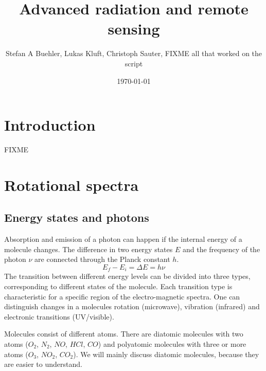 \documentclass[a4paper,fleqn]{article}
\title{Advanced radiation and remote sensing}
\author{Stefan A Buehler, Lukas Kluft, Christoph Sauter, FIXME all that worked on
the script}
\date{\today}
\begin{document}
\maketitle
\thispagestyle{empty}\pagestyle{empty}
\tableofcontents
\newpage\pagestyle{fancy}

\section{Introduction}

FIXME

\section{Rotational spectra}

\subsection{Energy states and photons}
Absorption and emission of a photon can happen if the internal energy of a
molecule changes. The difference in two energy states $E$ and the frequency of
the photon $\nu$ are connected through the Planck constant $h$.
\begin{equation}
  E_f - E_i = \Delta E = h \nu
\end{equation}
The transition between different energy levels can be divided into three types,
corresponding to different states of the molecule.  Each transition type is
characteristic for a specific region of the electro-magnetic spectra.  One can
distinguish changes in a molecules rotation (microwave), vibration (infrared)
and electronic transitions (UV/visible).

Molecules consist of different atoms. There are diatomic molecules with two
atoms ($O_2$, $N_2$, $NO$, $HCl$, $CO$) and polyatomic molecules with
three or more atoms ($O_3$, $NO_2$, $CO_2$). We will mainly discuss
diatomic molecules, because they are easier to understand.
\end{document}
